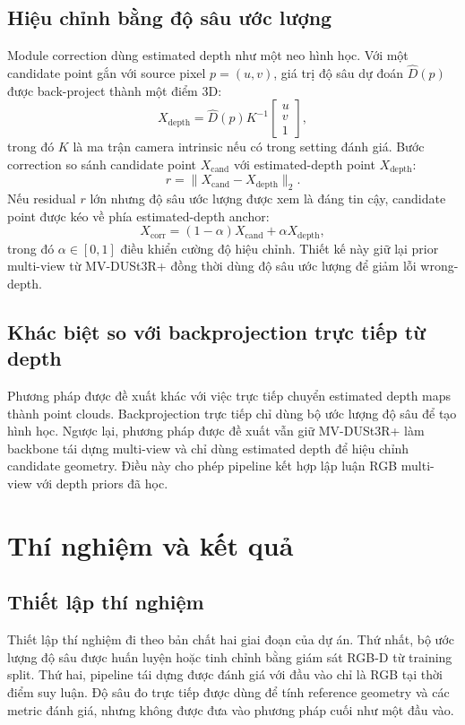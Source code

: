 \documentclass[12pt,a4paper]{article}
\newcommand{\mvdp}{MV-DUSt3R+}
\begin{document}
\subsection{Hiệu chỉnh bằng độ sâu ước lượng}
Module correction dùng estimated depth như một neo hình học. Với một candidate point gắn với source pixel $p=(u,v)$, giá trị độ sâu dự đoán $\hat{D}(p)$ được back-project thành một điểm 3D:
\begin{equation}
X_{\text{depth}} = \hat{D}(p)K^{-1}\begin{bmatrix}u\\v\\1\end{bmatrix},
\end{equation}
trong đó $K$ là ma trận camera intrinsic nếu có trong setting đánh giá. Bước correction so sánh candidate point $X_{\text{cand}}$ với estimated-depth point $X_{\text{depth}}$:
\begin{equation}
r = \|X_{\text{cand}}-X_{\text{depth}}\|_2.
\end{equation}
Nếu residual $r$ lớn nhưng độ sâu ước lượng được xem là đáng tin cậy, candidate point được kéo về phía estimated-depth anchor:
\begin{equation}
X_{\text{corr}} = (1-\alpha)X_{\text{cand}} + \alpha X_{\text{depth}},
\end{equation}
trong đó $\alpha \in [0,1]$ điều khiển cường độ hiệu chỉnh. Thiết kế này giữ lại prior multi-view từ \mvdp{} đồng thời dùng độ sâu ước lượng để giảm lỗi wrong-depth.

\subsection{Khác biệt so với backprojection trực tiếp từ depth}
Phương pháp được đề xuất khác với việc trực tiếp chuyển estimated depth maps thành point clouds. Backprojection trực tiếp chỉ dùng bộ ước lượng độ sâu để tạo hình học. Ngược lại, phương pháp được đề xuất vẫn giữ \mvdp{} làm backbone tái dựng multi-view và chỉ dùng estimated depth để hiệu chỉnh candidate geometry. Điều này cho phép pipeline kết hợp lập luận RGB multi-view với depth priors đã học.

\section{Thí nghiệm và kết quả}
\subsection{Thiết lập thí nghiệm}
Thiết lập thí nghiệm đi theo bản chất hai giai đoạn của dự án. Thứ nhất, bộ ước lượng độ sâu được huấn luyện hoặc tinh chỉnh bằng giám sát RGB-D từ training split. Thứ hai, pipeline tái dựng được đánh giá với đầu vào chỉ là RGB tại thời điểm suy luận. Độ sâu đo trực tiếp được dùng để tính reference geometry và các metric đánh giá, nhưng không được đưa vào phương pháp cuối như một đầu vào.
\end{document}
